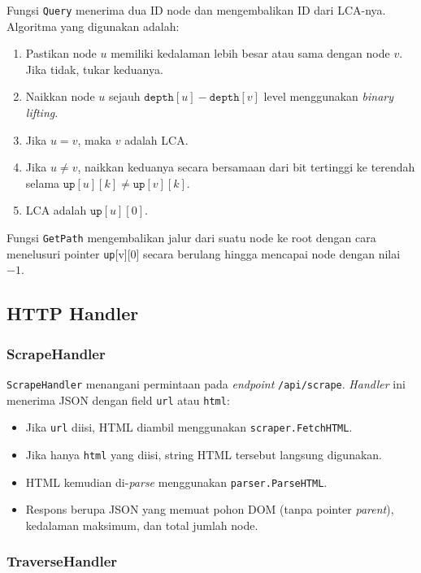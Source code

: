 Fungsi \texttt{Query} menerima dua ID node dan mengembalikan ID dari LCA-nya. Algoritma yang digunakan adalah:

\begin{enumerate}
    \item Pastikan node $u$ memiliki kedalaman lebih besar atau sama dengan node $v$. Jika tidak, tukar keduanya.
    \item Naikkan node $u$ sejauh $\texttt{depth}[u] - \texttt{depth}[v]$ level menggunakan \textit{binary lifting}.
    \item Jika $u = v$, maka $v$ adalah LCA.
    \item Jika $u \neq v$, naikkan keduanya secara bersamaan dari bit tertinggi ke terendah selama $\texttt{up}[u][k] \neq \texttt{up}[v][k]$.
    \item LCA adalah $\texttt{up}[u][0]$.
\end{enumerate}

Fungsi \texttt{GetPath} mengembalikan jalur dari suatu node ke root dengan cara menelusuri pointer \texttt{up}[v][0] secara berulang hingga mencapai node dengan nilai $-1$.

\subsection{HTTP Handler}

\subsubsection{ScrapeHandler}

\texttt{ScrapeHandler} menangani permintaan pada \textit{endpoint} \texttt{/api/scrape}. \textit{Handler} ini menerima JSON dengan field \texttt{url} atau \texttt{html}:

\begin{itemize}
    \item Jika \texttt{url} diisi, HTML diambil menggunakan \texttt{scraper.FetchHTML}.
    \item Jika hanya \texttt{html} yang diisi, string HTML tersebut langsung digunakan.
    \item HTML kemudian di-\textit{parse} menggunakan \texttt{parser.ParseHTML}.
    \item Respons berupa JSON yang memuat pohon DOM (tanpa pointer \textit{parent}), kedalaman maksimum, dan total jumlah node.
\end{itemize}

\subsubsection{TraverseHandler}

